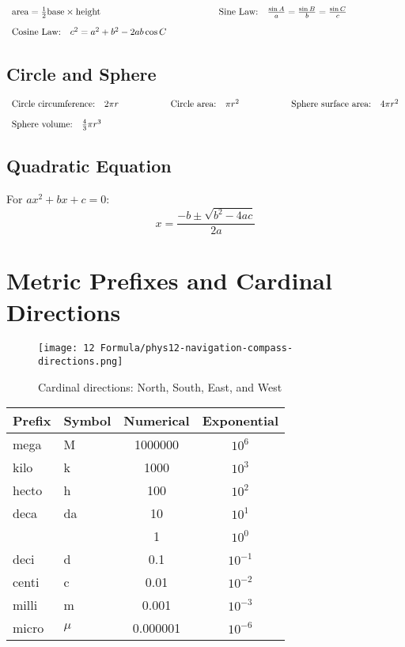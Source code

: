 \documentclass[12pt,a4paper]{article}
\begin{document}
\begin{align*}
  \begin{array}{l@{\hspace{2cm}}l@{\hspace{2cm}}l}
    \text{area} = \frac{1}{2} \text{base} \times \text{height} & \text{Sine Law:} \quad \frac{\sin A}{a} = \frac{\sin B}{b} = \frac{\sin C}{c} & \\[1em]
    \text{Cosine Law:} \quad c^2 = a^2 + b^2 - 2ab \cos C & &
  \end{array}
\end{align*}

\subsection{Circle and Sphere}
\begin{align*}
  \begin{array}{l@{\hspace{2cm}}l@{\hspace{2cm}}l}
    \text{Circle circumference:} \quad 2\pi r & \text{Circle area:} \quad \pi r^2 & \text{Sphere surface area:} \quad 4\pi r^2 \\[1em]
    \text{Sphere volume:} \quad \frac{4}{3}\pi r^3 & &
  \end{array}
\end{align*}

\subsection{Quadratic Equation}
For $ax^2 + bx + c = 0$: 
\[x = \frac{-b \pm \sqrt{b^2 - 4ac}}{2a}\]

\section{Metric Prefixes and Cardinal Directions}
\begin{figure}[H]
    \centering
    \texttt{[image: 12 Formula/phys12-navigation-compass-directions.png]}
    \caption{Cardinal directions: North, South, East, and West}
    \label{fig:Cardinal directions}
\end{figure}

\begin{table}[H]
\centering
\begin{tabular}{@{}llcc@{}}
\toprule
Prefix & Symbol & Numerical & Exponential \\
\midrule
mega & M & 1000000 & $10^6$ \\
kilo & k & 1000 & $10^3$ \\
hecto & h & 100 & $10^2$ \\
deca & da & 10 & $10^1$ \\
 &  & 1 & $10^0$ \\
deci & d & 0.1 & $10^{-1}$ \\
centi & c & 0.01 & $10^{-2}$ \\
milli & m & 0.001 & $10^{-3}$ \\
micro & $\mu$ & 0.000001 & $10^{-6}$ \\
\bottomrule
\end{tabular}
\end{table}
\end{document}

